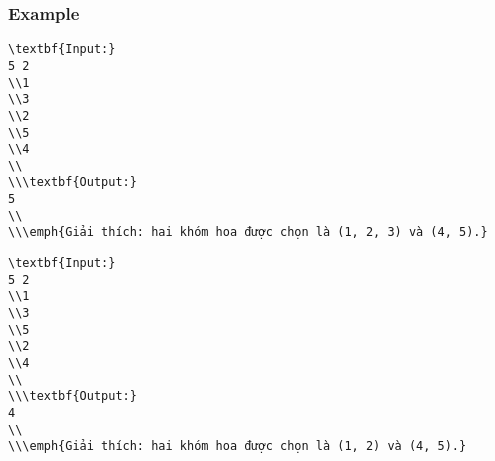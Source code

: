 \subsubsection{   Example  }
\begin{verbatim}
\textbf{Input:}
5 2
\\1 
\\3 
\\2 
\\5 
\\4
\\
\\\textbf{Output:}
5
\\
\\\emph{Giải thích: hai khóm hoa được chọn là (1, 2, 3) và (4, 5).}\end{verbatim}
\begin{verbatim}
\textbf{Input:}
5 2
\\1 
\\3 
\\5 
\\2 
\\4
\\
\\\textbf{Output:}
4
\\
\\\emph{Giải thích: hai khóm hoa được chọn là (1, 2) và (4, 5).}\end{verbatim}

